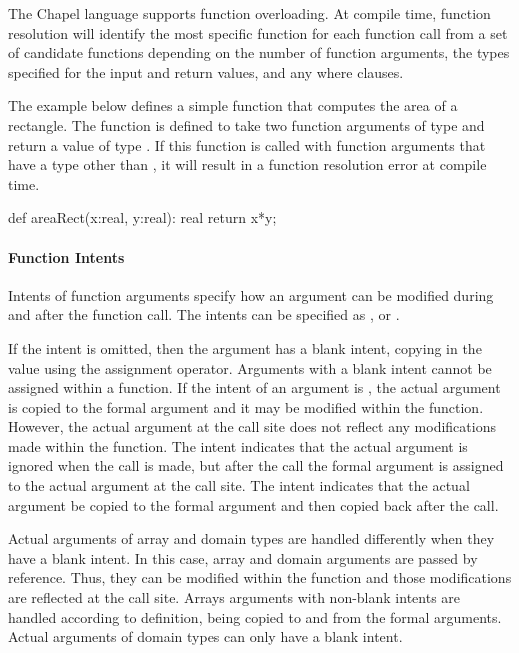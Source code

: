 The Chapel language supports function overloading.  At compile time, function
resolution will identify the most specific function for each function call from a set
of candidate functions depending on the number of function arguments, the types 
specified for the input and return values, and any where clauses.

\begin{example}
The example below defines a simple function that computes the area of a rectangle.
The  function is defined to take two function arguments of type
 and return a value of type .  If this function is called with 
function arguments that have a type other than , it will result in a function
resolution error at compile time.
\begin{chapel}
def areaRect(x:real, y:real): real {
  return x*y;
}
\end{chapel}
\end{example}

\paragraph{Function Intents}
Intents of function arguments specify how an argument can be
modified during and after the function call. 
The intents can be specified as ,  or .

If the intent is omitted, then the
argument has a blank intent, copying in the value using the assignment 
operator.  Arguments with a blank intent cannot be assigned within a function.
If the intent of an argument is , the actual argument is copied 
to the formal argument and it may be modified within the function.  However, 
the actual argument at the call site does not reflect any modifications 
made within the function.  The  intent indicates that the 
actual argument is ignored when the call is made, but after the
call the formal argument is assigned to the actual argument at the call site.
The  intent indicates that the actual argument be copied to 
the formal argument and then copied back after the call.

Actual arguments of array and domain types are handled differently when
they have a blank intent.  In this case, array and domain arguments are 
passed by reference.  Thus, they can be modified within the function and 
those modifications are reflected at the call site.  Arrays arguments 
with non-blank intents are handled according to definition, being copied 
to and from the formal arguments.  Actual arguments of domain types can
only have a blank intent.

